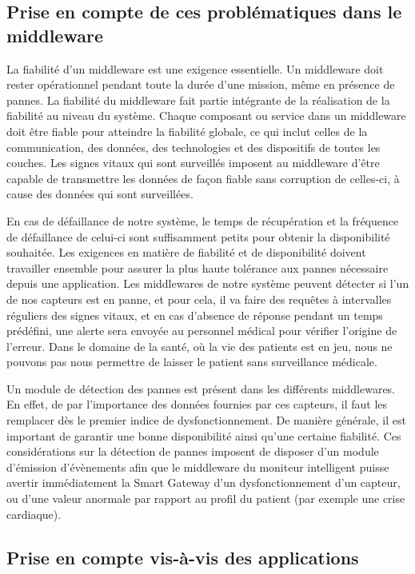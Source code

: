 \subsection{Prise en compte de ces problématiques dans le middleware}
 
La fiabilité d’un middleware est une exigence essentielle. Un middleware doit rester opérationnel pendant toute la durée d’une mission, même en présence de pannes. La fiabilité du middleware fait partie intégrante de la réalisation de la fiabilité au niveau du système. Chaque composant ou service dans un middleware doit être fiable pour atteindre la fiabilité globale, ce qui inclut celles de la communication, des données, des technologies et des dispositifs de toutes les couches. Les signes vitaux qui sont surveillés imposent au middleware d’être capable de transmettre les données de façon fiable sans corruption de celles-ci, à cause des données qui sont surveillées.

En cas de défaillance de notre système, le temps de récupération et la fréquence de défaillance de celui-ci sont suffisamment petits pour obtenir la disponibilité souhaitée. Les exigences en matière de fiabilité et de disponibilité doivent travailler ensemble pour assurer la plus haute tolérance aux pannes nécessaire depuis une application. Les middlewares de notre système peuvent détecter si l’un de nos capteurs est en panne, et pour cela, il va faire des requêtes à intervalles réguliers des signes vitaux, et en cas d’absence de réponse pendant un temps prédéfini, une alerte sera envoyée au personnel médical pour vérifier l’origine de l’erreur. Dans le domaine de la santé, où la vie des patients est en jeu, nous ne pouvons pas nous permettre de laisser le patient sans surveillance médicale.

Un module de détection des pannes est présent dans les différents middlewares. En effet, de par l’importance des données fournies par ces capteurs, il faut les remplacer dès le premier indice de dysfonctionnement. De manière générale, il est important de garantir une bonne disponibilité ainsi qu’une certaine fiabilité. Ces considérations sur la détection de pannes imposent de disposer d’un module d’émission d’évènements afin que le middleware du moniteur intelligent puisse avertir immédiatement la Smart Gateway d’un dysfonctionnement d’un capteur, ou d’une valeur anormale par rapport au profil du patient (par exemple une crise cardiaque).

\subsection{Prise en compte vis-à-vis des applications}
 
